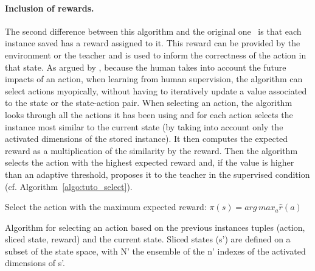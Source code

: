 \paragraph{Inclusion of rewards.} The second difference between this algorithm and the original one~\citep{cover1967nearest} is that each instance saved has a reward assigned to it. This reward can be provided by the environment or the teacher and is used to inform the correctness of the action in that state. As argued by \cite{knox2009interactively}, because the human takes into account the future impacts of an action, when learning from human supervision, the algorithm can select actions myopically, without having to iteratively update a value associated to the state or the state-action pair. When selecting an action, the algorithm looks through all the actions it has been using and for each action selects the instance most similar to the current state (by taking into account only the activated dimensions of the stored instance). It then computes the expected reward as a multiplication of the similarity by the reward. Then the algorithm selects the action with the highest expected reward and, if the value is higher than an adaptive threshold, proposes it to the teacher in the supervised condition (cf. Algorithm~\ref{algo:tuto_select}). 

\begin{algorithm}
	\DontPrintSemicolon
	Select the action with the maximum expected reward:
	$\pi(s) = arg\, max_{a} \hat{r}(a)$
	
	\caption{Algorithm for selecting an action based on the previous instances tuples (action, sliced state, reward) and the current state. Sliced states (s') are defined on a subset of the state space, with N' the ensemble of the n' indexes of the activated dimensions of s'.}
	\label{algo:tuto_select}
\end{algorithm}

